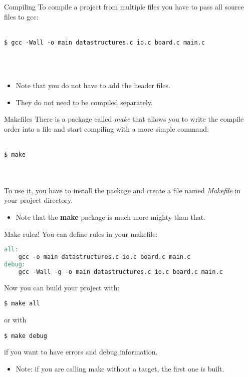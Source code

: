\subsection{}
\begin{frame}[fragile]{Compiling}
	To compile a project from multiple files you have to pass all source files to gcc:\\\ \\
	\begin{lstlisting}[numbers=none]
$ gcc -Wall -o main datastructures.c io.c board.c main.c
\end{lstlisting}\ \\\ \\
	\begin{itemize}
		\item Note that you do not have to add the header files.
		\item They do not need to be compiled separately.
	\end{itemize}
\end{frame}

\begin{frame}[fragile]{Makefiles}
	There is a package called \textit{make} that allows you to write the compile order into a file and start compiling with a more simple command:\\\ \\
	\begin{lstlisting}[numbers=none]
$ make
\end{lstlisting}\ \\\ \\
	To use it, you have to install the package and create a file named \textit{Makefile} in your project directory.\\
	\begin{itemize}
		\item Note that the \textbf{make} package is much more mighty than that.
	\end{itemize}
\end{frame}

\begin{frame}[fragile]{Make rulez!}
	You can define rules in your makefile:
	\begin{lstlisting}[language=make,basicstyle=\scriptsize,numbers=none]
all:
	gcc -o main datastructures.c io.c board.c main.c
debug:
	gcc -Wall -g -o main datastructures.c io.c board.c main.c
\end{lstlisting}
	Now you can build your project with:
	\begin{lstlisting}[basicstyle=\scriptsize,numbers=none]
$ make all
\end{lstlisting}
	or with
	\begin{lstlisting}[basicstyle=\scriptsize,numbers=none]
$ make debug
\end{lstlisting}
	if you want to have errors and debug information.
	\begin{itemize}
		\item Note: if you are calling make without a target, the first one is built.
	\end{itemize}
\end{frame}

